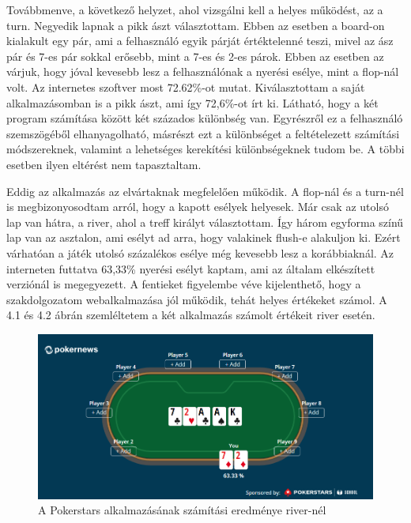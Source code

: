 Továbbmenve, a következő helyzet, ahol vizsgálni kell a helyes működést, az a turn. Negyedik lapnak a pikk ászt választottam. Ebben az esetben a board-on kialakult egy pár, ami a felhasználó egyik párját értéktelenné teszi, mivel az ász pár és 7-es pár sokkal erősebb, mint a 7-es és 2-es párok. Ebben az esetben az várjuk, hogy jóval kevesebb lesz a felhasználónak a nyerési esélye, mint a flop-nál volt. Az internetes szoftver most 72.62\%-ot mutat. Kiválasztottam a saját alkalmazásomban is a pikk ászt, ami így 72,6\%-ot írt ki. Látható, hogy a két program számítása között két százados különbség van. Egyrészről ez a felhasználó szemszögéből elhanyagolható, másrészt ezt a különbséget a feltételezett számítási módszereknek, valamint a lehetséges kerekítési különbségeknek tudom be. A többi esetben ilyen eltérést nem tapasztaltam.

Eddig az alkalmazás az elvártaknak megfelelően működik. A flop-nál és a turn-nél is megbizonyosodtam arról, hogy a kapott esélyek helyesek. Már csak az utolsó lap van hátra, a river, ahol a treff királyt választottam. Így három egyforma színű lap van az asztalon, ami esélyt ad arra, hogy valakinek flush-e alakuljon ki. Ezért várhatóan a játék utolsó százalékos esélye még kevesebb lesz a korábbiaknál. Az interneten futtatva 63,33\% nyerési esélyt kaptam, ami az általam elkészített verziónál is megegyezett. A fentieket figyelembe véve kijelenthető, hogy a szakdolgozatom webalkalmazása jól működik, tehát helyes értékeket számol. A 4.1 és 4.2 ábrán szemléltetem a két alkalmazás számolt értékeit river esetén.

\begin{figure}[h]
\centering
\includegraphics[scale=0.7]{images/test-ps.png}
\caption{A Pokerstars alkalmazásának számítási eredménye river-nél}
\label{fig:test-ps}
\end{figure}

